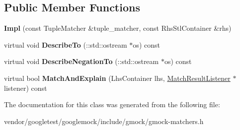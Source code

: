 \subsection*{Public Member Functions}
\begin{DoxyCompactItemize}
\item 
\mbox{\label{classtesting_1_1internal_1_1_pointwise_matcher_1_1_impl_aaf6841b254ef78395919dfc5705dd152}} 
{\bfseries Impl} (const Tuple\+Matcher \&tuple\+\_\+matcher, const Rhs\+Stl\+Container \&rhs)
\item 
\mbox{\label{classtesting_1_1internal_1_1_pointwise_matcher_1_1_impl_a0c699f62bbd02595471b793baa9cc75e}} 
virtual void {\bfseries Describe\+To} (\+::std\+::ostream $\ast$os) const
\item 
\mbox{\label{classtesting_1_1internal_1_1_pointwise_matcher_1_1_impl_a26d3a829149e4c497aaced42aad7b247}} 
virtual void {\bfseries Describe\+Negation\+To} (\+::std\+::ostream $\ast$os) const
\item 
\mbox{\label{classtesting_1_1internal_1_1_pointwise_matcher_1_1_impl_a4253946989f3743c4dd983909f2d062b}} 
virtual bool {\bfseries Match\+And\+Explain} (Lhs\+Container lhs, \mbox{\hyperlink{classtesting_1_1_match_result_listener}{Match\+Result\+Listener}} $\ast$listener) const
\end{DoxyCompactItemize}


The documentation for this class was generated from the following file\+:\begin{DoxyCompactItemize}
\item 
vendor/googletest/googlemock/include/gmock/gmock-\/matchers.\+h\end{DoxyCompactItemize}
